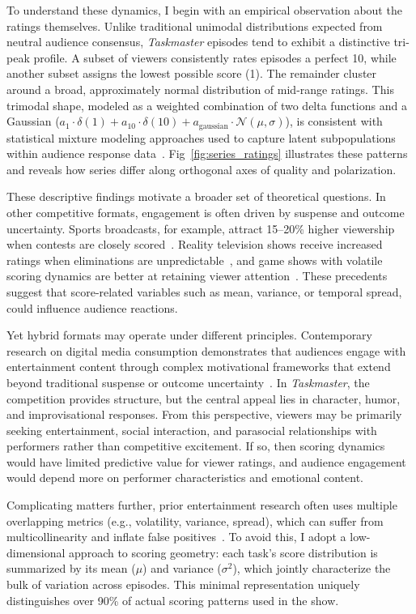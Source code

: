 \documentclass[10pt,letterpaper]{article}
\begin{document}
To understand these dynamics, I begin with an empirical observation about the ratings themselves. Unlike traditional unimodal distributions expected from neutral audience consensus, \textit{Taskmaster} episodes tend to exhibit a distinctive tri-peak profile. A subset of viewers consistently rates episodes a perfect 10, while another subset assigns the lowest possible score (1). The remainder cluster around a broad, approximately normal distribution of mid-range ratings. This trimodal shape, modeled as a weighted combination of two delta functions and a Gaussian ($a_1 \cdot \delta(1) + a_{10} \cdot \delta(10) + a_{\text{gaussian}} \cdot \mathcal{N}(\mu, \sigma)$), is consistent with statistical mixture modeling approaches used to capture latent subpopulations within audience response data~\cite{McLachlan2000}. Fig~\ref{fig:series_ratings} illustrates these patterns and reveals how series differ along orthogonal axes of quality and polarization.

These descriptive findings motivate a broader set of theoretical questions. In other competitive formats, engagement is often driven by suspense and outcome uncertainty. Sports broadcasts, for example, attract 15--20\% higher viewership when contests are closely scored~\cite{Rottenberg1956,Fort2003}. Reality television shows receive increased ratings when eliminations are unpredictable~\cite{Hall2009}, and game shows with volatile scoring dynamics are better at retaining viewer attention~\cite{Vorderer2004}. These precedents suggest that score-related variables such as mean, variance, or temporal spread, could influence audience reactions.

Yet hybrid formats may operate under different principles. Contemporary research on digital media consumption demonstrates that audiences engage with entertainment content through complex motivational frameworks that extend beyond traditional suspense or outcome uncertainty~\cite{GarciaBéjar2021}. In \textit{Taskmaster}, the competition provides structure, but the central appeal lies in character, humor, and improvisational responses. From this perspective, viewers may be primarily seeking entertainment, social interaction, and parasocial relationships with performers rather than competitive excitement. If so, then scoring dynamics would have limited predictive value for viewer ratings, and audience engagement would depend more on performer characteristics and emotional content.

Complicating matters further, prior entertainment research often uses multiple overlapping metrics (e.g., volatility, variance, spread), which can suffer from multicollinearity and inflate false positives~\cite{Gelman2007}. To avoid this, I adopt a low-dimensional approach to scoring geometry: each task’s score distribution is summarized by its mean ($\mu$) and variance ($\sigma^2$), which jointly characterize the bulk of variation across episodes. This minimal representation uniquely distinguishes over 90\% of actual scoring patterns used in the show.
\end{document}
